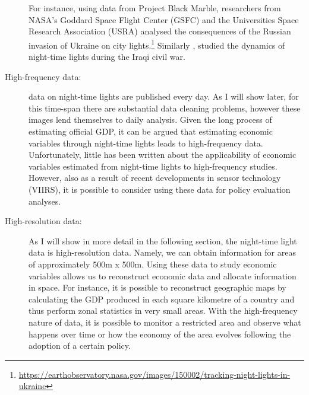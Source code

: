 \begin{description}
For instance, using data from Project Black Marble, researchers from NASA's Goddard Space Flight Center (GSFC) and the Universities Space Research Association (USRA) analysed the consequences of the Russian invasion of Ukraine on city lights.\footnote{\url{https://earthobservatory.nasa.gov/images/150002/tracking-night-lights-in-ukraine}}
Similarly \citep{li2018night}, studied the dynamics of night-time lights during the Iraqi civil war.
\item[High-frequency data:] data on night-time lights are published every day. As I will show later, for this time-span there are substantial data cleaning problems, however these images lend themselves to daily analysis. Given the long process of estimating official GDP, it can be argued that estimating economic variables through night-time lights leads to high-frequency data. Unfortunately, little has been written about the applicability of economic variables estimated from night-time lights to high-frequency studies. However, also as a result of recent developments in sensor technology (VIIRS), it is possible to consider using these data for policy evaluation analyses.
\item[High-resolution data:]
As I will show in more detail in the following section, the night-time light data is high-resolution data. Namely, we can obtain information for areas of approximately 500m x 500m.
Using these data to study economic variables allows us to reconstruct economic data and allocate information in space. For instance, it is possible to reconstruct geographic maps by calculating the GDP produced in each square kilometre of a country and thus perform zonal statistics in very small areas. With the high-frequency nature of data, it is possible to monitor a restricted area and observe what happens over time or how the economy of the area evolves following the adoption of a certain policy.
\end{description}

